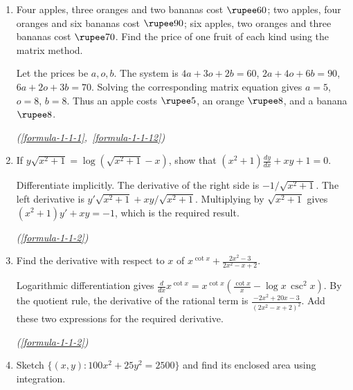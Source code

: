 \begin{enumerate}[label={},font=\normalfont,leftmargin=1.15cm,labelwidth=1.0cm,labelsep=0.15cm,itemindent=0pt,listparindent=0pt,itemsep=\baselineskip,parsep=0pt,topsep=0pt]
\item[5.1.32] Four apples, three oranges and two bananas cost $\rupee 60$; two apples, four oranges and six bananas cost $\rupee 90$; six apples, two oranges and three bananas cost $\rupee 70$. Find the price of one fruit of each kind using the matrix method.

\vspace{0.6em}\par\solution


Let the prices be $a,o,b$. The system is $4a+3o+2b=60$, $2a+4o+6b=90$, $6a+2o+3b=70$. Solving the corresponding matrix equation gives $a=5$, $o=8$, $b=8$. Thus an apple costs $\rupee 5$, an orange $\rupee 8$, and a banana $\rupee 8$.\par\noindent\hfill\mbox{\textit{(\ref{formula-1-1-1}, \ref{formula-1-1-12})}}\par

\item[5.1.33.1] If $y\sqrt{x^2+1}=\log(\sqrt{x^2+1}-x)$, show that $(x^2+1)\frac{dy}{dx}+xy+1=0$.

\vspace{0.6em}\par\solution


Differentiate implicitly. The derivative of the right side is $-1/\sqrt{x^2+1}$. The left derivative is $y'\sqrt{x^2+1}+xy/\sqrt{x^2+1}$. Multiplying by $\sqrt{x^2+1}$ gives $(x^2+1)y'+xy=-1$, which is the required result.\par\noindent\hfill\mbox{\textit{(\ref{formula-1-1-2})}}\par

\item[5.1.33.2] Find the derivative with respect to $x$ of $x^{\cot x}+\frac{2x^2-3}{2x^2-x+2}$.

\vspace{0.6em}\par\solution


Logarithmic differentiation gives $\frac{d}{dx}x^{\cot x}=x^{\cot x}(\frac{\cot x}{x}-\log x\,\csc^2x)$. By the quotient rule, the derivative of the rational term is $\frac{-2x^2+20x-3}{(2x^2-x+2)^2}$. Add these two expressions for the required derivative.\par\noindent\hfill\mbox{\textit{(\ref{formula-1-1-2})}}\par

\item[5.1.34] Sketch $\{(x,y):100x^2+25y^2=2500\}$ and find its enclosed area using integration.


\end{enumerate}
